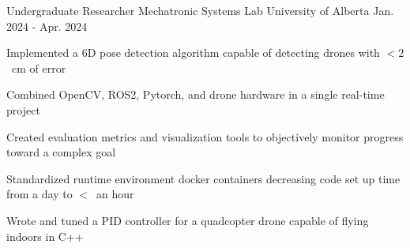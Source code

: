 

\begin{cventries}
\cventry
{Undergraduate Researcher} %
{Mechatronic Systems Lab} %
{University of Alberta} %
{Jan. 2024 - Apr. 2024} %
{
  \begin{cvitems} %
    \item Implemented a 6D pose detection algorithm capable of detecting drones with $<2$~cm of error
    \item Combined OpenCV, ROS2, Pytorch, and drone hardware in a single real-time project
    \item Created evaluation metrics and visualization tools to objectively monitor progress toward a complex goal
    \item Standardized runtime environment docker containers decreasing code set up time from a day to $<$~an hour 
    \item Wrote and tuned a PID controller for a quadcopter drone capable of flying indoors in C++
  \end{cvitems}
  }
    

  

\end{cventries}
